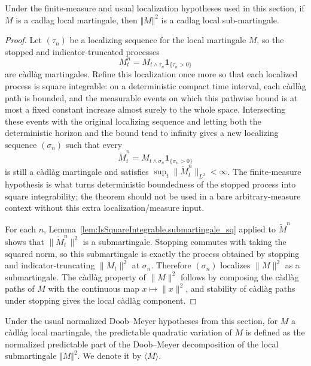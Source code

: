 \begin{lemma}\label{lem:IsLocalMartingale.isLocalSubmartingale_sq_norm}
Under the finite-measure and usual localization hypotheses used in this
section, if $M$ is a cadlag local martingale, then $\Vert M \Vert^2$ is a
cadlag local sub-martingale.
\end{lemma}

\begin{proof}
Let $(\tau_n)$ be a localizing sequence for the local martingale $M$, so
the stopped and indicator-truncated processes
\[
  M^n_t = M_{t \wedge \tau_n}\mathbf{1}_{\{\tau_n > 0\}}
\]
are càdlàg martingales.  Refine this localization once more so that each
localized process is square integrable: on a deterministic compact time
interval, each càdlàg path is bounded, and the measurable events on which this
pathwise bound is at most a fixed constant increase almost surely to the whole
space.  Intersecting these events with the original localizing sequence and
letting both the deterministic horizon and the bound tend to infinity gives a
new localizing sequence $(\sigma_n)$ such that every
\[
  \widetilde M^n_t
  = M_{t \wedge \sigma_n}\mathbf{1}_{\{\sigma_n > 0\}}
\]
is still a càdlàg martingale and satisfies
\(\sup_t \|\widetilde M^n_t\|_{L^2}<\infty\).
The finite-measure hypothesis is what turns deterministic boundedness of the
stopped process into square integrability; the theorem should not be used in a
bare arbitrary-measure context without this extra localization/measure input.

For each $n$, Lemma~\ref{lem:IsSquareIntegrable.submartingale_sq} applied to
\(\widetilde M^n\) shows that
\(\|\widetilde M^n_t\|^2\) is a submartingale.  Stopping commutes with taking
the squared norm, so this submartingale is exactly the process obtained by
stopping and indicator-truncating \(\|M_t\|^2\) at \(\sigma_n\).  Therefore
\((\sigma_n)\) localizes \(\|M\|^2\) as a submartingale.  The càdlàg property
of \(\|M\|^2\) follows by composing the càdlàg paths of \(M\) with the
continuous map \(x \mapsto \|x\|^2\), and stability of càdlàg paths under
stopping gives the local càdlàg component.
\end{proof}


\begin{definition}\label{def:quadraticVariation}
Under the usual normalized Doob--Meyer hypotheses from this section, for $M$ a
càdlàg local martingale, the predictable quadratic variation of $M$ is defined
as the normalized predictable part of the Doob--Meyer decomposition of the
local submartingale $\Vert M \Vert^2$.  We denote it by $\langle M \rangle$.
\end{definition}


